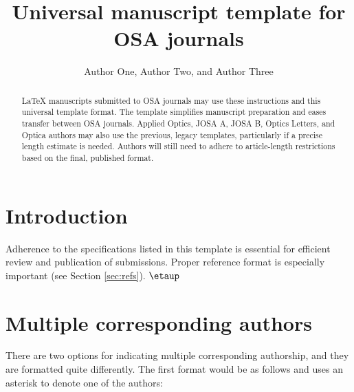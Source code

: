 \documentclass{osa-article}
\begin{document}
\title{Universal manuscript template for OSA journals}

\author{Author One, Author Two, and Author Three}

\address{Peer Review, Publications Department, The Optical Society (OSA), 2010 Massachusetts Avenue NW, Washington, DC 20036, USA\\
Publications Department, The Optical Society (OSA), 2010 Massachusetts Avenue NW, Washington, DC 20036, USA\\
Currently with the Department of Electronic Journals, The Optical Society (OSA), 2010 Massachusetts Avenue NW, Washington, DC 20036, USA}




\begin{abstract}
\LaTeX{} manuscripts submitted to OSA journals may use these instructions and this universal template format. The template simplifies manuscript preparation and eases transfer between OSA journals. Applied Optics, JOSA A, JOSA B, Optics Letters, and Optica authors may also use the previous, legacy templates, particularly if a precise length estimate is needed. Authors will still need to adhere to article-length restrictions based on the final, published format.
\end{abstract}

\section{Introduction}
Adherence to the specifications listed in this template is essential for efficient review and publication of submissions. Proper reference format is especially important (see Section \ref{sec:refs}). $\etaup$

\section{Multiple corresponding authors}

There are two options for indicating multiple corresponding authorship, and they are formatted quite differently. The first format would be as follows and uses an asterisk to denote one of the authors:
\end{document}
